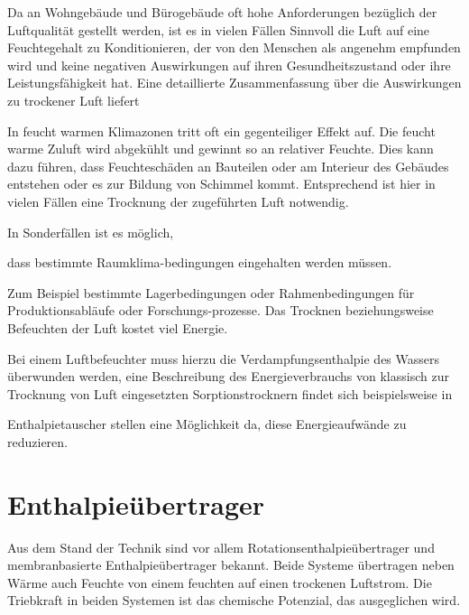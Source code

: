 \documentclass[ 11pt
				,ngerman
				,headsepline
				,headings=small
				,numbers=noenddot %
				,draft=false
				,BCOR=0mm %
				,DIV=12
				,captions=tableheading
				,paper=a4
				,abstracton
                ]{scrreprt}
\begin{document}
\begin{normalsize}
\begin{LARGE}
Da an Wohngebäude und Bürogebäude oft hohe Anforderungen bezüglich der Luftqualität gestellt werden, ist es in vielen Fällen Sinnvoll die Luft auf eine Feuchtegehalt zu Konditionieren, der von den Menschen als angenehm empfunden wird und keine negativen Auswirkungen auf ihren Gesundheitszustand oder ihre Leistungsfähigkeit hat. Eine detaillierte Zusammenfassung über die Auswirkungen zu trockener Luft liefert 

In feucht warmen Klimazonen tritt oft ein gegenteiliger Effekt auf. Die feucht warme Zuluft wird abgekühlt und gewinnt so an relativer Feuchte. Dies kann dazu führen, dass Feuchteschäden an Bauteilen oder am Interieur des Gebäudes entstehen oder es zur Bildung von Schimmel kommt. Entsprechend ist hier in vielen Fällen eine Trocknung der zugeführten Luft notwendig. 

In Sonderfällen ist es möglich,


 dass bestimmte Raumklima-bedingungen 
 eingehalten werden müssen. 


Zum Beispiel bestimmte Lagerbedingungen oder 
Rahmenbedingungen für Produktionsabläufe oder Forschungs-prozesse. 
Das Trocknen beziehungsweise Befeuchten der Luft kostet viel Energie.
 
 
 Bei einem Luftbefeuchter muss hierzu die 
 Verdampfungsenthalpie des Wassers überwunden werden, 
 eine Beschreibung des Energieverbrauchs 
 von klassisch zur Trocknung von Luft eingesetzten 
 Sorptionstrocknern findet sich beispielsweise in 

Enthalpietauscher stellen eine Möglichkeit da,
 diese Energieaufwände zu reduzieren. 

\section{Enthalpieübertrager}
\label{Enthalpieübertrager}

Aus dem Stand der Technik sind vor allem Rotationsenthalpieübertrager und membranbasierte Enthalpieübertrager bekannt. Beide Systeme übertragen neben Wärme auch Feuchte von einem feuchten auf einen trockenen Luftstrom. Die Triebkraft in beiden Systemen ist das chemische Potenzial, das ausgeglichen wird. 


\end{LARGE}
\end{normalsize}
\end{document}
